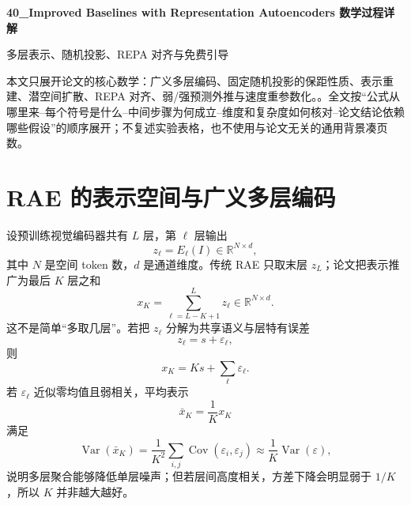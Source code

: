 \documentclass[UTF8,12pt,a4paper,fontset=none]{ctexart}
\numberwithin{equation}{section}
\newcommand{\R}{\mathbb{R}}
\begin{document}
\begin{center}
{\LARGE\bfseries 40\_Improved Baselines with Representation Autoencoders 数学过程详解}\par
\vspace{0.35em}
{\large 多层表示、随机投影、REPA 对齐与免费引导}
\end{center}
\vspace{0.45em}
\begin{keybox}[本文只处理真正需要推导的部分]
本文只展开论文的核心数学：广义多层编码、固定随机投影的保距性质、表示重建、潜空间扩散、REPA 对齐、弱/强预测外推与速度重参数化。。全文按“公式从哪里来--每个符号是什么--中间步骤为何成立--维度和复杂度如何核对--论文结论依赖哪些假设”的顺序展开；不复述实验表格，也不使用与论文无关的通用背景凑页数。
\end{keybox}
\tableofcontents
\newpage

\section{RAE 的表示空间与广义多层编码}
设预训练视觉编码器共有 $L$ 层，第 $\ell$ 层输出
\begin{equation}
 z_\ell=E_\ell(I)\in\R^{N\times d},
\end{equation}
其中 $N$ 是空间 token 数，$d$ 是通道维度。传统 RAE 只取末层 $z_L$；论文把表示推广为最后 $K$ 层之和
\begin{equation}
 \boxed{x_K=\sum_{\ell=L-K+1}^{L}z_\ell\in\R^{N\times d}.}
\end{equation}
这不是简单“多取几层”。若把 $z_\ell$ 分解为共享语义与层特有误差
\begin{equation}
 z_\ell=s+\varepsilon_\ell,
\end{equation}
则
\begin{equation}
 x_K=Ks+\sum_{\ell}\varepsilon_\ell.
\end{equation}
若 $\varepsilon_\ell$ 近似零均值且弱相关，平均表示
\begin{equation}
 \bar x_K=\frac1Kx_K
\end{equation}
满足
\begin{equation}
 \operatorname{Var}(\bar x_K)
 =\frac1{K^2}\sum_{i,j}\operatorname{Cov}(\varepsilon_i,\varepsilon_j)
 \approx\frac1K\operatorname{Var}(\varepsilon),
\end{equation}
说明多层聚合能够降低单层噪声；但若层间高度相关，方差下降会明显弱于 $1/K$，所以 $K$ 并非越大越好。
\end{document}
